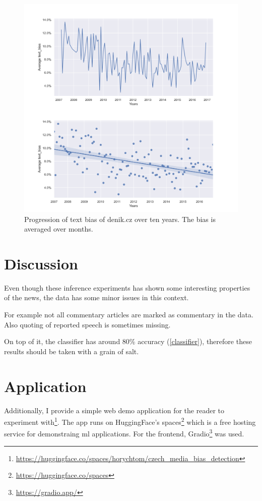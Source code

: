 \begin{figure}

  \includegraphics[scale=0.5]{my_modules/multimedia/inference/months_clean.jpg}
  \caption{Progression of text bias of denik.cz over ten years. The bias is averaged over months.}
  \label{fig:months_clean}
\end{figure}





\section{Discussion}
Even though these inference experiments has shown some interesting properties of the news, the data has some minor issues in this context. 

For example not all commentary articles are marked as commentary in the data. Also quoting of reported speech is sometimes missing. 

On top of it, the classifier has around 80\% accuracy (\ref{classifier}), therefore these results should be taken with a grain of salt.




\section{Application}
Additionally, I provide a simple web demo application for the reader to experiment with\footnote{\url{https://huggingface.co/spaces/horychtom/czech_media_bias_detection}}. The app runs on HuggingFace's spaces\footnote{\url{https://huggingface.co/spaces}} which is a free hosting service for demonstraing \gls{ml} applications. For the frontend, Gradio\footnote{\url{https://gradio.app/}} was used.

